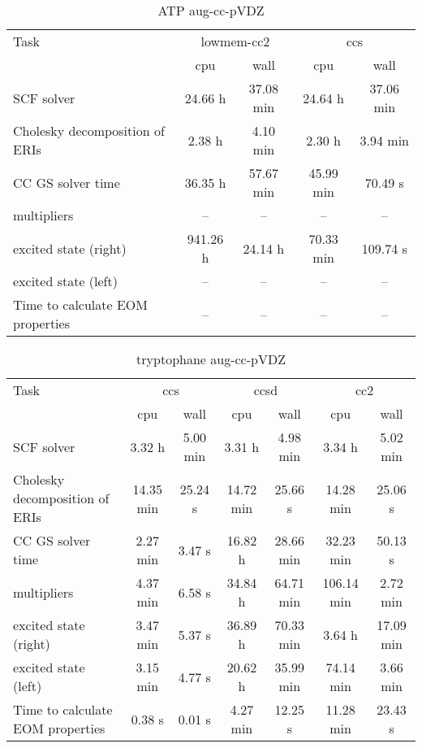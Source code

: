 \documentclass{article}
\begin{document}
\begin{table}
\caption{ATP aug-cc-pVDZ}
\begin{tabular}{lcccc}
\toprule
Task & \multicolumn{2}{c}{lowmem-cc2} & \multicolumn{2}{c}{ccs}\\
\cmidrule(lr){2-3}\cmidrule(lr){4-5}
 & cpu & wall & cpu & wall\\
\midrule
SCF solver & 24.66 h & 37.08 min & 24.64 h & 37.06 min\\
Cholesky decomposition of ERIs & 2.38 h & 4.10 min & 2.30 h & 3.94 min\\
CC GS solver time & 36.35 h & 57.67 min & 45.99 min & 70.49 s\\
multipliers & -- & -- & -- & --\\
excited state (right) & 941.26 h & 24.14 h & 70.33 min & 109.74 s\\
excited state (left) & -- & -- & -- & --\\
Time to calculate EOM properties & -- & -- & -- & --\\
\bottomrule
\end{tabular}
\end{table}
\begin{table}
\caption{tryptophane aug-cc-pVDZ}
\begin{tabular}{lcccccc}
\toprule
Task & \multicolumn{2}{c}{ccs} & \multicolumn{2}{c}{ccsd} & \multicolumn{2}{c}{cc2}\\
\cmidrule(lr){2-3}\cmidrule(lr){4-5}\cmidrule(lr){6-7}
 & cpu & wall & cpu & wall & cpu & wall\\
\midrule
SCF solver & 3.32 h & 5.00 min & 3.31 h & 4.98 min & 3.34 h & 5.02 min\\
Cholesky decomposition of ERIs & 14.35 min & 25.24 s & 14.72 min & 25.66 s & 14.28 min & 25.06 s\\
CC GS solver time & 2.27 min & 3.47 s & 16.82 h & 28.66 min & 32.23 min & 50.13 s\\
multipliers & 4.37 min & 6.58 s & 34.84 h & 64.71 min & 106.14 min & 2.72 min\\
excited state (right) & 3.47 min & 5.37 s & 36.89 h & 70.33 min & 3.64 h & 17.09 min\\
excited state (left) & 3.15 min & 4.77 s & 20.62 h & 35.99 min & 74.14 min & 3.66 min\\
Time to calculate EOM properties & 0.38 s & 0.01 s & 4.27 min & 12.25 s & 11.28 min & 23.43 s\\
\bottomrule
\end{tabular}
\end{table}
\end{document}

